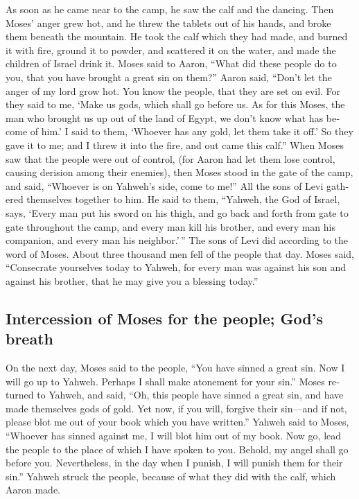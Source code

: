 \begin{paracol}{2}
\begin{otherlanguage}{english}
 As soon as he came near to the camp, he saw the calf and
the dancing. Then Moses' anger grew hot, and he threw the tablets out of
his hands, and broke them beneath the mountain.  He took
the calf which they had made, and burned it with fire, ground it to
powder, and scattered it on the water, and made the children of Israel
drink it.  Moses said to Aaron, ``What did these people
do to you, that you have brought a great sin on them?'' 
Aaron said, ``Don't let the anger of my lord grow hot. You know the
people, that they are set on evil.  For they said to me,
`Make us gods, which shall go before us. As for this Moses, the man who
brought us up out of the land of Egypt, we don't know what has become of
him.'  I said to them, `Whoever has any gold, let them
take it off.' So they gave it to me; and I threw it into the fire, and
out came this calf.''  When Moses saw that the people
were out of control, (for Aaron had let them lose control, causing
derision among their enemies),  then Moses stood in the
gate of the camp, and said, ``Whoever is on Yahweh's side, come to me!''
All the sons of Levi gathered themselves together to him.
 He said to them, ``Yahweh, the God of Israel, says,
`Every man put his sword on his thigh, and go back and forth from gate
to gate throughout the camp, and every man kill his brother, and every
man his companion, and every man his neighbor.'\,''  The
sons of Levi did according to the word of Moses. About three thousand
men fell of the people that day.  Moses said,
``Consecrate yourselves today to Yahweh, for every man was against his
son and against his brother, that he may give you a blessing today.''

\hypertarget{intercession-of-moses-for-the-people-gods-breath}{%
\subsection{Intercession of Moses for the people; God's
breath}\label{intercession-of-moses-for-the-people-gods-breath}}

 On the next day, Moses said to the people, ``You have
sinned a great sin. Now I will go up to Yahweh. Perhaps I shall make
atonement for your sin.''  Moses returned to Yahweh, and
said, ``Oh, this people have sinned a great sin, and have made
themselves gods of gold.  Yet now, if you will, forgive
their sin---and if not, please blot me out of your book which you have
written.''  Yahweh said to Moses, ``Whoever has sinned
against me, I will blot him out of my book.  Now go, lead
the people to the place of which I have spoken to you. Behold, my angel
shall go before you. Nevertheless, in the day when I punish, I will
punish them for their sin.''  Yahweh struck the people,
because of what they did with the calf, which Aaron made.


\end{otherlanguage}
\end{paracol}
